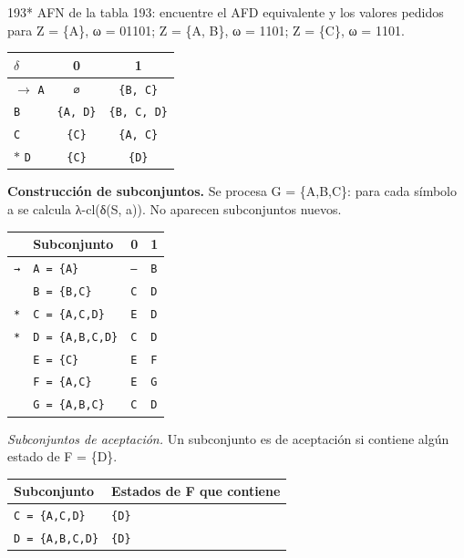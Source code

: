 \documentclass[11pt]{article}
\begin{document}
\begin{ejercicio}{193}{*}
AFN de la tabla 193: encuentre el AFD equivalente y los valores pedidos para Z = \{A\}, ω = 01101; Z = \{A, B\}, ω = 1101; Z = \{C\}, ω = 1101.
\end{ejercicio}
\proc \begin{center}\small\begin{tabular}{lcc}\toprule
$\delta$ & 0 & 1 \\\midrule
$\to$ \texttt{A} & \texttt{∅} & \texttt{\{B, C\}} \\
 \texttt{B} & \texttt{\{A, D\}} & \texttt{\{B, C, D\}} \\
 \texttt{C} & \texttt{\{C\}} & \texttt{\{A, C\}} \\
$*$ \texttt{D} & \texttt{\{C\}} & \texttt{\{D\}} \\
\bottomrule\end{tabular}\end{center}
\textbf{Construcción de subconjuntos.} Se procesa G = \{A,B,C\}: para cada símbolo a se calcula λ-cl(δ(S, a)). No aparecen subconjuntos nuevos.
\begin{center}\footnotesize\begin{tabular}{llll}\toprule
 & Subconjunto & 0 & 1 \\\midrule
\texttt{→} & \texttt{A = \{A\}} & \texttt{—} & \texttt{B} \\
\texttt{} & \texttt{B = \{B,C\}} & \texttt{C} & \texttt{D} \\
\texttt{*} & \texttt{C = \{A,C,D\}} & \texttt{E} & \texttt{D} \\
\texttt{*} & \texttt{D = \{A,B,C,D\}} & \texttt{C} & \texttt{D} \\
\texttt{} & \texttt{E = \{C\}} & \texttt{E} & \texttt{F} \\
\texttt{} & \texttt{F = \{A,C\}} & \texttt{E} & \texttt{G} \\
\texttt{} & \texttt{G = \{A,B,C\}} & \texttt{C} & \texttt{D} \\
\bottomrule\end{tabular}\end{center}
\textit{Subconjuntos de aceptación.} Un subconjunto es de aceptación si contiene algún estado de F = \{D\}.
\begin{center}\footnotesize\begin{tabular}{ll}\toprule
Subconjunto & Estados de F que contiene \\\midrule
\texttt{C = \{A,C,D\}} & \texttt{\{D\}} \\
\texttt{D = \{A,B,C,D\}} & \texttt{\{D\}} \\
\bottomrule\end{tabular}\end{center}
\end{document}
